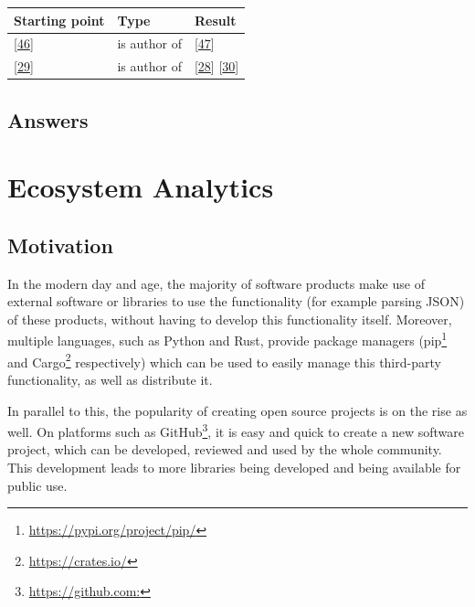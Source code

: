 \documentclass[]{book}
\let\rmarkdownfootnote\footnote%
\def\footnote{\protect\rmarkdownfootnote}
\begin{document}
\begin{longtable}[]{@{}lll@{}}
\toprule
Starting point & Type & Result\tabularnewline
\midrule
\endhead
{[}\protect\hyperlink{ref-DAmbros2010}{46}{]} & is author of &
{[}\protect\hyperlink{ref-DAmbros2012}{47}{]}\tabularnewline
{[}\protect\hyperlink{ref-Catal2009review}{29}{]} & is author of &
{[}\protect\hyperlink{ref-Catal2011}{28}{]}
{[}\protect\hyperlink{ref-Catal2009investigating}{30}{]}\tabularnewline
\bottomrule
\end{longtable}

\section{Answers}\label{answers-1}

\chapter{Ecosystem Analytics}\label{ecosystem-analytics}

\section{Motivation}\label{motivation-3}

In the modern day and age, the majority of software products make use of
external software or libraries to use the functionality (for example
parsing JSON) of these products, without having to develop this
functionality itself. Moreover, multiple languages, such as Python and
Rust, provide package managers (pip\footnote{\url{https://pypi.org/project/pip/}}
and Cargo\footnote{\url{https://crates.io/}} respectively) which can be
used to easily manage this third-party functionality, as well as
distribute it.

In parallel to this, the popularity of creating open source projects is
on the rise as well. On platforms such as GitHub\footnote{\url{https://github.com:}},
it is easy and quick to create a new software project, which can be
developed, reviewed and used by the whole community. This development
leads to more libraries being developed and being available for public
use.
\end{document}
